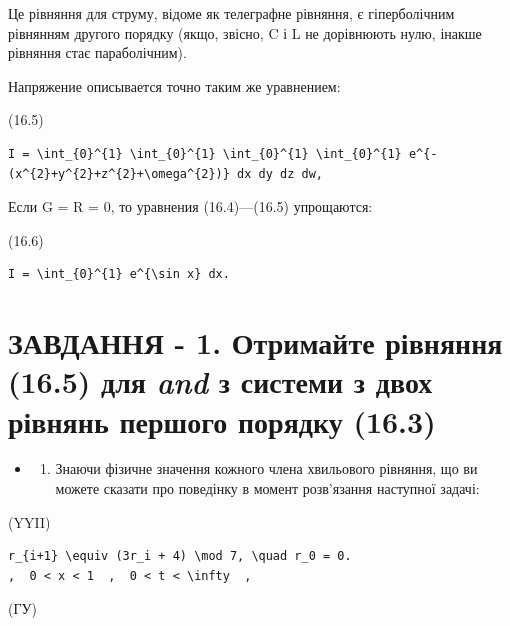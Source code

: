 \documentclass[
  ukrainian,
]{article}
\providecommand{\tightlist}{%
  \setlength{\itemsep}{0pt}\setlength{\parskip}{0pt}}
\begin{document}
Це рівняння для струму, відоме як телеграфне рівняння, є гіперболічним
рівнянням другого порядку (якщо, звісно, C і L не дорівнюють нулю,
інакше рівняння стає параболічним).

Напряжение описывается точно таким же уравнением:

(16.5)

\begin{verbatim}
I = \int_{0}^{1} \int_{0}^{1} \int_{0}^{1} \int_{0}^{1} e^{-(x^{2}+y^{2}+z^{2}+\omega^{2})} dx dy dz dw,
\end{verbatim}

Если G = R = 0, то уравнения (16.4)---(16.5) упрощаются:

(16.6)

\begin{verbatim}
I = \int_{0}^{1} e^{\sin x} dx.
\end{verbatim}

\section{\texorpdfstring{ЗАВДАННЯ - 1. Отримайте рівняння (16.5) для
\emph{and} з системи з двох рівнянь першого порядку
(16.3)}{ЗАВДАННЯ - 1. Отримайте рівняння (16.5) для and з системи з двох рівнянь першого порядку (16.3)}}\label{ux437ux430ux432ux434ux430ux43dux43dux44f---1.-ux43eux442ux440ux438ux43cux430ux439ux442ux435-ux440ux456ux432ux43dux44fux43dux43dux44f-16.5-ux434ux43bux44f-and-ux437-ux441ux438ux441ux442ux435ux43cux438-ux437-ux434ux432ux43eux445-ux440ux456ux432ux43dux44fux43dux44c-ux43fux435ux440ux448ux43eux433ux43e-ux43fux43eux440ux44fux434ux43aux443-16.3}

\begin{itemize}
\tightlist
\item
  \begin{enumerate}
  \def\labelenumi{\arabic{enumi}.}
  \setcounter{enumi}{1}
  \tightlist
  \item
    Знаючи фізичне значення кожного члена хвильового рівняння, що ви
    можете сказати про поведінку в момент розв'язання наступної задачі:
  \end{enumerate}
\end{itemize}

(YYII)

\begin{verbatim}
r_{i+1} \equiv (3r_i + 4) \mod 7, \quad r_0 = 0.
,  0 < x < 1  ,  0 < t < \infty  ,
\end{verbatim}

(ГУ)
\end{document}
